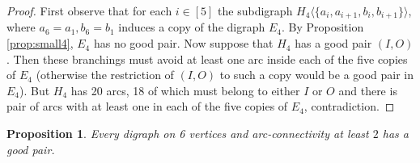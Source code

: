\documentclass{article}
\newtheorem{proposition}[theorem]{Proposition}
\theoremstyle{definition}
\newcommand{\2}{\vspace{0.2cm}}
\begin{document}
\begin{proof}
  First observe that for each $i\in [5]$ the subdigraph
  $H_4\langle \{a_i,a_{i+1},b_i,b_{i+1}\}\rangle$, where $a_6=a_1,b_6=b_1$ induces
  a copy of the digraph $E_4$. By Proposition \ref{prop:small4}, $E_4$
  has no good pair. Now suppose that $H_4$ has a good pair
  $(I,O)$. Then these branchings must avoid at least one arc inside
  each of the five copies of $E_4$ (otherwise the restriction of $(I,O)$
  to such a copy would be a good pair in $E_4$). But $H_4$ has 20 arcs,
  18 of which must belong to either $I$ or $O$ and there is pair of arcs with at least one in each of the 
  five copies of $E_4$, contradiction.
  \end{proof}



  \begin{proposition}
    \label{prop:n=6OK}
    Every digraph on 6 vertices and arc-connectivity at least $2$ has a good pair.
  \end{proposition}
\end{document}
